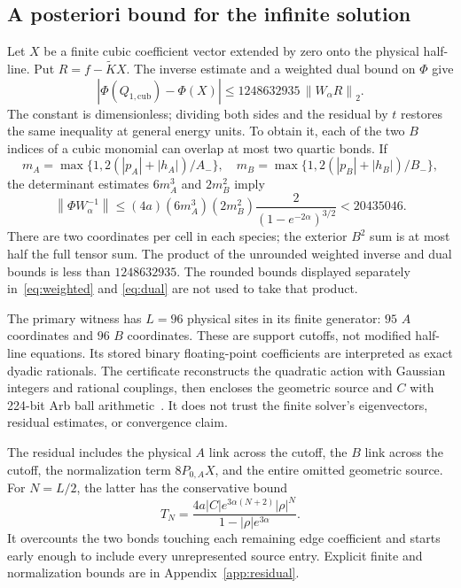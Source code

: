 \documentclass[11pt,a4paper]{article}
\newcommand{\norm}[1]{\left\lVert#1\right\rVert}
\begin{document}
\subsection{A posteriori bound for the infinite solution}
Let $X$ be a finite cubic coefficient vector extended by zero onto the
physical half-line. Put $R=f-\widetilde KX$. The inverse estimate and a
weighted dual bound on $\Phi$ give
\begin{equation}
 |\Phi(Q_{1,\mathrm{cub}})-\Phi(X)|
 \leq 1248632935\,\norm{W_\alpha R}_2.\label{eq:error}
\end{equation}
The constant is dimensionless; dividing both sides and the residual by $t$
restores the same inequality at general energy units. To obtain it, each
of the two $B$ indices of a cubic monomial can overlap at most two quartic
bonds. If
\begin{equation}
 m_A=\max\{1,2(|p_A|+|h_A|)/A_-\},\quad
 m_B=\max\{1,2(|p_B|+|h_B|)/B_-\},\label{eq:rowbound}
\end{equation}
the determinant estimates $6m_A^3$ and $2m_B^2$ imply
\begin{equation}
 \norm{\Phi W_\alpha^{-1}}
 \leq (4a)(6m_A^3)(2m_B^2)
           \frac{2}{(1-e^{-2\alpha})^{3/2}}
 <20435046.\label{eq:dual}
\end{equation}
There are two coordinates per cell in each species; the exterior $B^2$
sum is at most half the full tensor sum. The product of the unrounded
weighted inverse and dual bounds is less than $1248632935$.
The rounded bounds displayed separately in~\eqref{eq:weighted} and
\eqref{eq:dual} are not used to take that product.

The primary witness has $L=96$ physical sites in its finite generator:
$95$ $A$ coordinates and $96$ $B$ coordinates. These are support cutoffs,
not modified half-line equations. Its stored binary floating-point
coefficients are interpreted as exact dyadic rationals. The certificate
reconstructs the quadratic action with Gaussian integers and rational
couplings, then encloses the geometric source and $C$ with 224-bit Arb
ball arithmetic~\cite{Johansson2017}. It does not trust the finite solver's
eigenvectors, residual estimates, or convergence claim.

The residual includes the physical $A$ link across the cutoff, the $B$
link across the cutoff, the normalization term $8P_{0,A}X$, and the
entire omitted geometric source. For $N=L/2$, the latter has the
conservative bound
\begin{equation}
 T_N=\frac{4a|C|e^{3\alpha(N+2)}|\rho|^N}
                  {1-|\rho|e^{3\alpha}}.\label{eq:tail}
\end{equation}
It overcounts the two bonds touching each remaining edge coefficient and
starts early enough to include every unrepresented source entry. Explicit
finite and normalization bounds are in Appendix~\ref{app:residual}.
\end{document}
